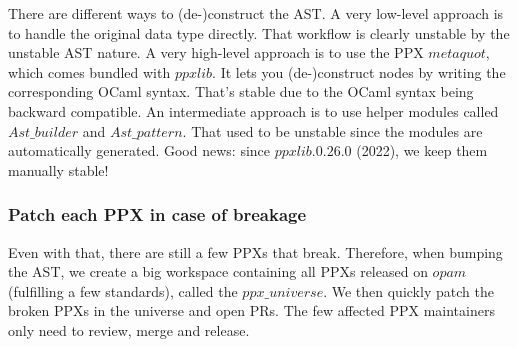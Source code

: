\documentclass[10pt, a4paper, twocolumn]{article}
\begin{document}
There are different ways to (de-)construct the AST. A very low-level approach is to handle the original data type directly. That workflow is clearly unstable by the unstable AST nature. A very high-level approach is to use the PPX $metaquot$, which comes bundled with $ppxlib$. It lets you (de-)construct nodes by writing the corresponding OCaml syntax. That's stable due to the OCaml syntax being backward compatible. An intermediate approach is to use helper modules called $Ast\_builder$ and $Ast\_pattern$. That used to be unstable since the modules are automatically generated. Good news: since $ppxlib.0.26.0 $ (2022), we keep them manually stable!

%
%

\subsubsection*{Patch each PPX in case of breakage}

Even with that, there are still a few PPXs that break. Therefore, when bumping the AST, we create a big workspace containing all PPXs released on $opam$ (fulfilling a few standards), called the $ppx\_universe$\cite{universe}. We then quickly patch the broken PPXs in the universe and open PRs. The few affected PPX maintainers only need to review, merge and release.


\nocite{*}


\end{document}
